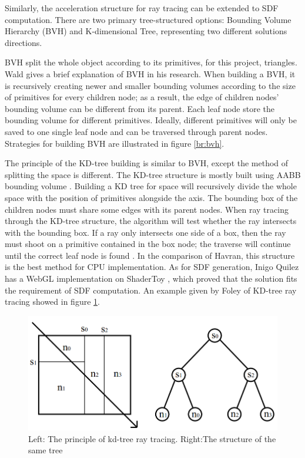  Similarly, the acceleration structure for ray tracing can be extended to SDF computation. There are two primary tree-structured options: Bounding Volume Hierarchy (BVH) and K-dimensional Tree, representing two different solutions directions.

\hspace*{\fill}

 BVH split the whole object according to its primitives, for this project, triangles. Wald \cite{bvhraytracing} gives a brief explanation of BVH in his research. When building a BVH, it is recursively creating newer and smaller bounding volumes according to the size of primitives for every children node; as a result, the edge of children nodes' bounding volume can be different from its parent. Each leaf node store the bounding volume for different primitives. Ideally, different primitives will only be saved to one single leaf node and can be traversed through parent nodes. Strategies for building BVH are illustrated in figure \ref{br:bvh}.

\hspace*{\fill}

The principle of the KD-tree building is similar to BVH, except the method of splitting the space is different. The KD-tree structure is mostly built using AABB bounding volume \cite{kdraytracing}. Building a KD tree for space will recursively divide the whole space with the position of primitives alongside the axis. The bounding box of the children nodes must share some edges with its parent nodes. When ray tracing through the KD-tree structure, the algorithm will test whether the ray intersects with the bounding box. If a ray only intersects one side of a box, then the ray must shoot on a primitive contained in the box node; the traverse will continue until the correct leaf node is found \cite{kdraytracing}. In the comparison of Havran\cite{Havran2000HeuristicRS}, this structure is the best method for CPU implementation. As for SDF generation, Inigo Quilez has a WebGL implementation on ShaderToy \cite{kdtoy}, which proved that the solution fits the requirement of SDF computation. An example given by Foley \cite{kdraytracing} of KD-tree ray tracing showed in figure \ref{br:kd}. 

\begin{figure}[htbp]
    \centering
    \includegraphics[width=14cm]{Images/Chap2/kd.png}
    \caption{Left: The principle of kd-tree ray tracing. Right:The structure of the same tree}
    \label{br:kd}
\end{figure}


